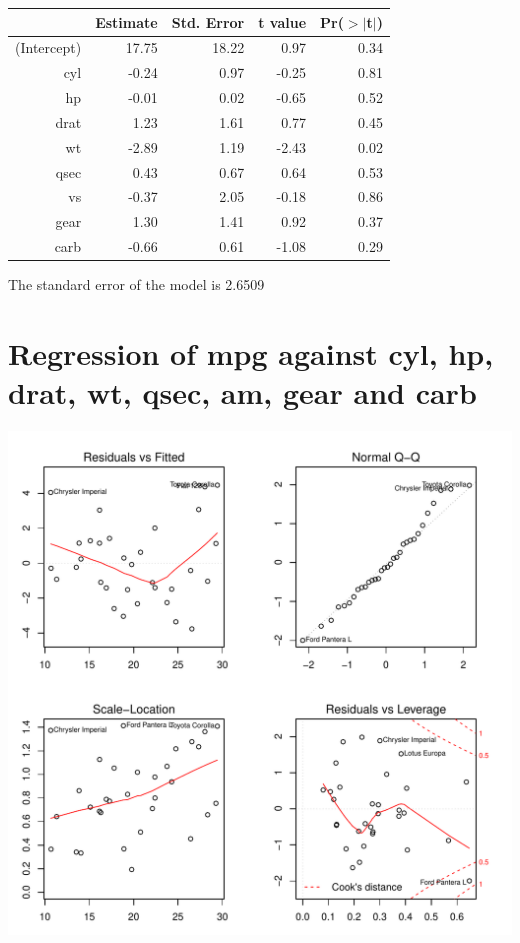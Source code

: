 \documentclass{article}\usepackage[]{graphicx}\usepackage[]{color}
\makeatletter
\def\maxwidth{ %
  \ifdim\Gin@nat@width>\linewidth
    \linewidth
  \else
    \Gin@nat@width
  \fi
}
\newenvironment{knitrout}{}{} %
\makeatother
\begin{document}
\begin{table}[ht]
\centering
\begin{tabular}{rrrrr}
  \hline
 & Estimate & Std. Error & t value & Pr($>$$|$t$|$) \\ 
  \hline
(Intercept) & 17.75 & 18.22 & 0.97 & 0.34 \\ 
  cyl & -0.24 & 0.97 & -0.25 & 0.81 \\ 
  hp & -0.01 & 0.02 & -0.65 & 0.52 \\ 
  drat & 1.23 & 1.61 & 0.77 & 0.45 \\ 
  wt & -2.89 & 1.19 & -2.43 & 0.02 \\ 
  qsec & 0.43 & 0.67 & 0.64 & 0.53 \\ 
  vs & -0.37 & 2.05 & -0.18 & 0.86 \\ 
  gear & 1.30 & 1.41 & 0.92 & 0.37 \\ 
  carb & -0.66 & 0.61 & -1.08 & 0.29 \\ 
   \hline
\end{tabular}
\end{table}




The standard error of the model is 2.6509

\newpage

\section{Regression of mpg against cyl, hp, drat, wt, qsec, am, gear and carb }
\begin{knitrout}
\color{fgcolor}

{\centering \includegraphics[width=\maxwidth]{figure/lm-cyl-hp-drat-wt-qsec-am-gear-carb} 

}



\end{knitrout}
\end{document}
